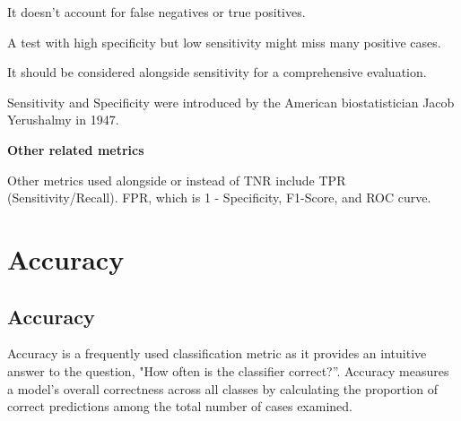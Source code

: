 {
\item It doesn't account for false negatives or true positives.
\item A test with high specificity but low sensitivity might miss many positive cases.
\item It should be considered alongside sensitivity for a comprehensive evaluation.
}

\clearpage
\thispagestyle{customstyle}

{
    Sensitivity and Specificity were introduced by the American biostatistician Jacob Yerushalmy in 1947.
}

\textbf{Other related metrics}

Other metrics used alongside or instead of TNR include TPR (Sensitivity/Recall). FPR, which is 1 - Specificity, F1-Score, and ROC curve.

\clearpage

\thispagestyle{classificationstyle}
\section{Accuracy}
\subsection{Accuracy} 

Accuracy is a frequently used classification metric as it provides an intuitive answer to the question, "How often is the classifier correct?”.
Accuracy measures a model's overall correctness across all classes by calculating the proportion of correct predictions among the total number of cases examined.

\begin{center}
\end{center}

